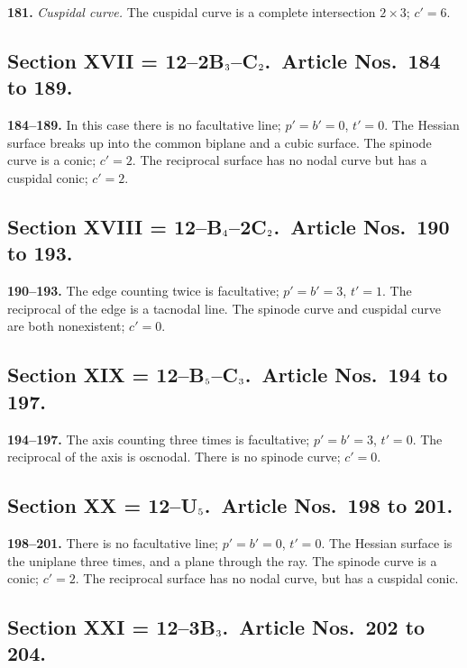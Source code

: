 \documentclass[11pt,a4paper]{article}
\theoremstyle{definition}
\begin{document}
\setcounter{page}{441}

\noindent\textbf{181.} \textit{Cuspidal curve.} The cuspidal curve is a complete intersection $2\times 3$; $c'=6$.

\subsection*{Section XVII = 12--2B$_{\mbox{\scriptsize 3}}$--C$_{\mbox{\scriptsize 2}}$.\ Article Nos.\ 184 to 189.}

\noindent\textbf{184--189.} In this case there is no facultative line; $p'=b'=0$, $t'=0$. The Hessian surface breaks up into the common biplane and a cubic surface. The spinode curve is a conic; $c'=2$. The reciprocal surface has no nodal curve but has a cuspidal conic; $c'=2$.

\subsection*{Section XVIII = 12--B$_{\mbox{\scriptsize 4}}$--2C$_{\mbox{\scriptsize 2}}$.\ Article Nos.\ 190 to 193.}

\noindent\textbf{190--193.} The edge counting twice is facultative; $p'=b'=3$, $t'=1$. The reciprocal of the edge is a tacnodal line. The spinode curve and cuspidal curve are both nonexistent; $c'=0$.

\subsection*{Section XIX = 12--B$_{\mbox{\scriptsize 5}}$--C$_{\mbox{\scriptsize 3}}$.\ Article Nos.\ 194 to 197.}

\noindent\textbf{194--197.} The axis counting three times is facultative; $p'=b'=3$, $t'=0$. The reciprocal of the axis is oscnodal. There is no spinode curve; $c'=0$.

\subsection*{Section XX = 12--U$_{\mbox{\scriptsize 5}}$.\ Article Nos.\ 198 to 201.}

\noindent\textbf{198--201.} There is no facultative line; $p'=b'=0$, $t'=0$. The Hessian surface is the uniplane three times, and a plane through the ray. The spinode curve is a conic; $c'=2$. The reciprocal surface has no nodal curve, but has a cuspidal conic.

\subsection*{Section XXI = 12--3B$_{\mbox{\scriptsize 3}}$.\ Article Nos.\ 202 to 204.}
\end{document}
